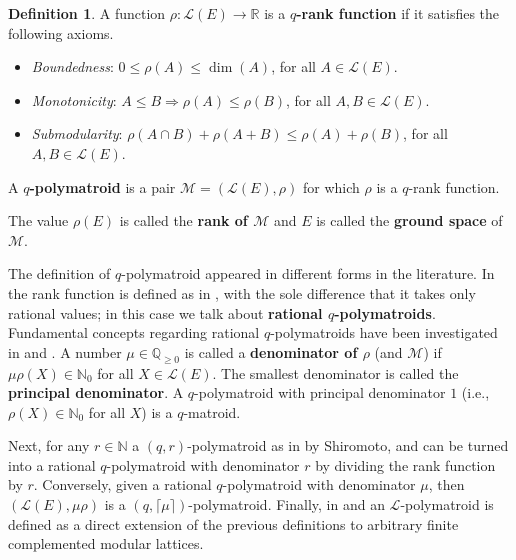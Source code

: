 \documentclass[a4paper,11pt,reqno]{amsart}
\theoremstyle{definition}
\newtheorem{definition}[theorem]{{{Definition}}}
\newcommand{\mM}{\mathcal{M}}
\newcommand{\mL}{\mathcal{L}}
\begin{document}
{\begin{definition}\label{def:rank_axioms}
A function $\rho: \mL(E)\longrightarrow \mathbb{R}$ is a \textbf{$q$-rank function} if it satisfies the following axioms.
\begin{itemize}
	\item[(R1)] \emph{Boundedness}: $0\leq \rho(A) \leq \dim(A)$, for all $A \in \mL(E)$.
	\item[(R2)] \emph{Monotonicity}: $A\leq B \Rightarrow \rho(A)\leq \rho(B)$,  for all $A,B \in \mL(E)$.
	\item[(R3)] \emph{Submodularity}: $\rho(A \cap B)+\rho(A+B)\leq \rho(A) +\rho(B)$, for all $A,B \in \mL(E)$.
\end{itemize}
A \textbf{$q$-polymatroid} is a pair $\mathcal{M}=(\mL(E),\rho)$ for which $\rho$ is a $q$-rank function.
\end{definition}
The value $\rho(E)$ is called the \textbf{rank of $\mathcal{M}$} and $E$ is called the \textbf{ground space} of $\mM$. 



The definition of $q$-polymatroid appeared in different forms in the literature. In \cite[Def. 2.1]{gluesing2022independent} the rank function is defined as in , with the sole difference that it takes only rational values; in this case we talk about \textbf{rational $q$-polymatroids}. Fundamental concepts regarding rational $q$-polymatroids have been investigated in \cite{gluesing2022q} and \cite{gluesing2022independent}.
A number $\mu\in\mathbb{Q}_{\geq 0}$ is called a \textbf{denominator of $\rho$}  (and $\mathcal{M}$) if $\mu \rho(X) \in \mathbb{N}_0$ for all $X\in\mL(E)$. The smallest denominator is called the \textbf{principal denominator}. A $q$-polymatroid with
principal denominator $1$ (i.e., $\rho(X)\in\mathbb{N}_0$ for all $X$) is a $q$-matroid.  

Next, for any $r\in\mathbb{N}$ a
$(q, r)$-polymatroid as in \cite[Def. 2]{shiromoto2019codes} by Shiromoto, \cite[Def. 1]{ghorpade2020polymatroid} 
and \cite[Def. 1]{byrne2024weighted} can be turned into a rational $q$-polymatroid with denominator $r$ by
dividing the rank function by $r$. Conversely, given a rational $q$-polymatroid with denominator $\mu$,
then $(\mL(E), \mu\rho)$ is a $(q,\lceil \mu\rceil)$-polymatroid. Finally, in \cite[Def. 2.12]{alfarano2023critical} and \cite[Def. 2.2]{byrne2023cyclic} an $\mL$-polymatroid is defined as a direct extension of the previous definitions to arbitrary finite complemented modular lattices.

}
\end{document}
